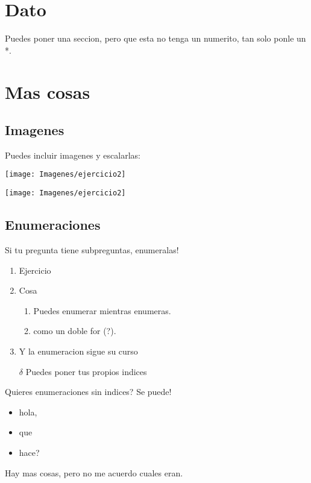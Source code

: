 \section*{Dato}

Puedes poner una seccion, pero que esta no tenga un numerito, tan solo ponle un *.

\section{Mas cosas}

\subsection{Imagenes}

Puedes incluir imagenes y escalarlas:

\texttt{[image: Imagenes/ejercicio2]}

\texttt{[image: Imagenes/ejercicio2]}



\subsection{Enumeraciones}

Si tu pregunta tiene subpreguntas, enumeralas!

\begin{enumerate}
	\item Ejercicio
	\item Cosa
	\begin{enumerate}
		\item Puedes enumerar mientras enumeras.
		\item como un doble for (?).
	\end{enumerate}
	\item Y la enumeracion sigue su curso
	\item[$\delta$] Puedes poner tus propios indices
\end{enumerate}

Quieres enumeraciones sin indices? Se puede!

\begin{itemize}
	\item hola,
	\item que
	\item hace?
\end{itemize}

Hay mas cosas, pero no me acuerdo cuales eran.

